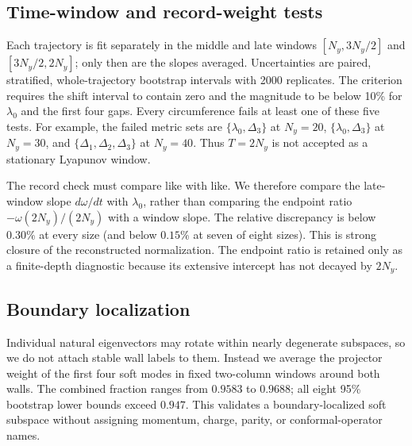 \documentclass[aps,prb,twocolumn,floatfix,nofootinbib,superscriptaddress]{revtex4-2}
\begin{document}
\subsection{Time-window and record-weight tests}

Each trajectory is fit separately in the middle and late windows \([N_y,3N_y/2]\) and \([3N_y/2,2N_y]\); only then are the slopes averaged.  Uncertainties are paired, stratified, whole-trajectory bootstrap intervals with 2000 replicates.  The criterion requires the shift interval to contain zero and the magnitude to be below 10\% for \(\lambda_0\) and the first four gaps.  Every circumference fails at least one of these five tests.  For example, the failed metric sets are \(\{\lambda_0,\Delta_3\}\) at \(N_y=20\), \(\{\lambda_0,\Delta_3\}\) at \(N_y=30\), and \(\{\Delta_1,\Delta_2,\Delta_3\}\) at \(N_y=40\).  Thus \(T=2N_y\) is not accepted as a stationary Lyapunov window.

The record check must compare like with like.  We therefore compare the late-window slope $d\omega/dt$ with \(\lambda_0\), rather than comparing the endpoint ratio \(-\omega(2N_y)/(2N_y)\) with a window slope.  The relative discrepancy is below $0.30\%$ at every size (and below $0.15\%$ at seven of eight sizes).  This is strong closure of the reconstructed normalization.  The endpoint ratio is retained only as a finite-depth diagnostic because its extensive intercept has not decayed by $2N_y$.

\subsection{Boundary localization}

Individual natural eigenvectors may rotate within nearly degenerate subspaces, so we do not attach stable wall labels to them.  Instead we average the projector weight of the first four soft modes in fixed two-column windows around both walls.  The combined fraction ranges from $0.9583$ to $0.9688$; all eight 95\% bootstrap lower bounds exceed $0.947$.  This validates a boundary-localized soft subspace without assigning momentum, charge, parity, or conformal-operator names.
\end{document}
